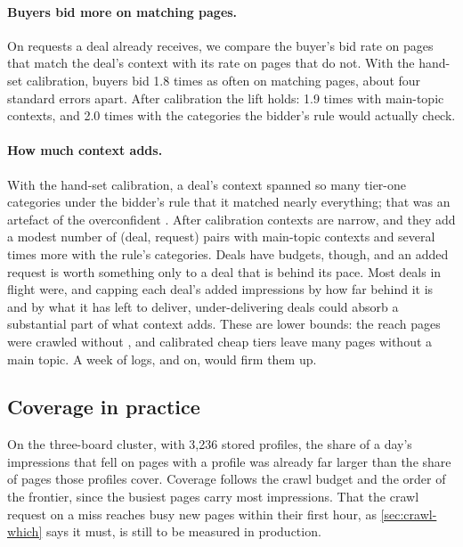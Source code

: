 \paragraph{Buyers bid more on matching pages.} On requests a deal already receives, we compare the buyer's bid rate on pages that match the deal's context with its rate on pages that do not. With the hand-set calibration, buyers bid 1.8 times as often on matching pages, about four standard errors apart. After calibration the lift holds: 1.9 times with main-topic contexts, and 2.0 times with the categories the bidder's rule would actually check.

\paragraph{How much context adds.} With the hand-set calibration, a deal's context spanned so many tier-one categories under the bidder's rule that it matched nearly everything; that was an artefact of the overconfident . After calibration contexts are narrow, and they add a modest number of (deal, request) pairs with main-topic contexts and several times more with the rule's categories. Deals have budgets, though, and an added request is worth something only to a deal that is behind its pace. Most deals in flight were, and capping each deal's added impressions by how far behind it is and by what it has left to deliver, under-delivering deals could absorb a substantial part of what context adds. These are lower bounds: the reach pages were crawled without , and calibrated cheap tiers leave many pages without a main topic. A week of logs, and  on, would firm them up.

\subsection{Coverage in practice}\label{sec:eval-coverage}

On the three-board cluster, with 3,236 stored profiles, the share of a day's impressions that fell on pages with a profile was already far larger than the share of pages those profiles cover. Coverage follows the crawl budget and the order of the frontier, since the busiest pages carry most impressions. That the crawl request on a miss reaches busy new pages within their first hour, as \cref{sec:crawl-which} says it must, is still to be measured in production.
